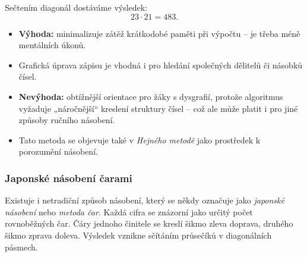 \documentclass[12pt,a4paper]{article}
\begin{document}
\begin{center}
\end{center}

Sečtením diagonál dostáváme výsledek:
\[
23 \cdot 21 = 483.
\]

\begin{notebox}
\begin{itemize}
    \item \textbf{Výhoda:} minimalizuje zátěž krátkodobé paměti při výpočtu – je třeba méně mentálních úkonů.  
    \item Grafická úprava zápisu je vhodná i pro hledání společných dělitelů či násobků čísel.  
    \item \textbf{Nevýhoda:} obtížnější orientace pro žáky s dysgrafií, protože algoritmus vyžaduje „náročnější“ kreslení struktury čísel – což ale může platit i pro jiné způsoby ručního násobení.  
    \item Tato metoda se objevuje také v \emph{Hejného metodě} jako prostředek k porozumění násobení.  
\end{itemize}
\end{notebox}


\subsubsection*{Japonské násobení čarami}
Existuje i netradiční způsob násobení, který se někdy označuje jako \emph{japonské násobení} nebo \emph{metoda čar}.  
Každá cifra se znázorní jako určitý počet rovnoběžných čar. Čáry jednoho činitele se kreslí šikmo zleva doprava, druhého šikmo zprava doleva.  
Výsledek vznikne sčítáním průsečíků v diagonálních pásmech.  
\end{document}
